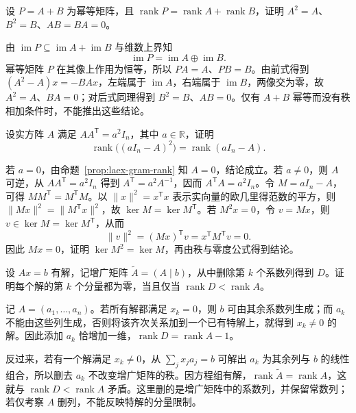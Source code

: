 \begin{example}
\label{ex:laex-sum-idempotents}
设 $P=A+B$ 为幂等矩阵，且 $\operatorname{rank}P=\operatorname{rank}A+\operatorname{rank}B$，证明 $A^2=A$、$B^2=B$、$AB=BA=0$。
\end{example}

\begin{solve}
由 $\operatorname{im}P\subseteq\operatorname{im}A+\operatorname{im}B$ 与维数上界知
\[
\operatorname{im}P=\operatorname{im}A\oplus\operatorname{im}B.
\]
幂等矩阵 $P$ 在其像上作用为恒等，所以 $PA=A$、$PB=B$。由前式得到 $(A^2-A)x=-BAx$，左端属于 $\operatorname{im}A$，右端属于 $\operatorname{im}B$，两像交为零，故 $A^2=A$、$BA=0$；对后式同理得到 $B^2=B$、$AB=0$。仅有 $A+B$ 幂等而没有秩相加条件时，不能推出这些结论。
\end{solve}

\begin{example}
\label{ex:laex-normal-rank-stability}
设实方阵 $A$ 满足 $AA^{\mathsf T}=a^2I_n$，其中 $a\in\mathbb R$，证明
\[
\operatorname{rank}\bigl((aI_n-A)^2\bigr)=\operatorname{rank}(aI_n-A).
\]
\end{example}

\begin{solve}
若 $a=0$，由命题~\ref{prop:laex-gram-rank} 知 $A=0$，结论成立。若 $a\ne0$，则 $A$ 可逆，从 $AA^{\mathsf T}=a^2I_n$ 得到 $A^{\mathsf T}=a^2A^{-1}$，因而 $A^{\mathsf T}A=a^2I_n$。令 $M=aI_n-A$，可得 $MM^{\mathsf T}=M^{\mathsf T}M$。以 $\|x\|^2=x^{\mathsf T}x$ 表示实向量的欧几里得范数的平方，则 $\|Mx\|^2=\|M^{\mathsf T}x\|^2$，故 $\ker M=\ker M^{\mathsf T}$。若 $M^2x=0$，令 $v=Mx$，则 $v\in\ker M=\ker M^{\mathsf T}$，从而
\[
\|v\|^2=(Mx)^{\mathsf T}v=x^{\mathsf T}M^{\mathsf T}v=0.
\]
因此 $Mx=0$，证明 $\ker M^2=\ker M$，再由秩与零度公式得到结论。
\end{solve}

\begin{example}
\label{ex:laex-zero-coordinate}
设 $Ax=b$ 有解，记增广矩阵 $\widetilde A=(A\mid b)$，从中删除第 $k$ 个系数列得到 $D$。证明每个解的第 $k$ 个分量都为零，当且仅当 $\operatorname{rank}D<\operatorname{rank}A$。
\end{example}

\begin{solve}
记 $A=(a_1,\ldots,a_n)$。若所有解都满足 $x_k=0$，则 $b$ 可由其余系数列生成；而 $a_k$ 不能由这些列生成，否则将该齐次关系加到一个已有特解上，就得到 $x_k\ne0$ 的解。因此添加 $a_k$ 恰增加一维，$\operatorname{rank}D=\operatorname{rank}A-1$。

反过来，若有一个解满足 $x_k\ne0$，从 $\sum_jx_ja_j=b$ 可解出 $a_k$ 为其余列与 $b$ 的线性组合，所以删去 $a_k$ 不改变增广矩阵的秩。因方程组有解，$\operatorname{rank}\widetilde A=\operatorname{rank}A$，这就与 $\operatorname{rank}D<\operatorname{rank}A$ 矛盾。这里删的是增广矩阵中的系数列，并保留常数列；若仅考察 $A$ 删列，不能反映特解的分量限制。
\end{solve}

